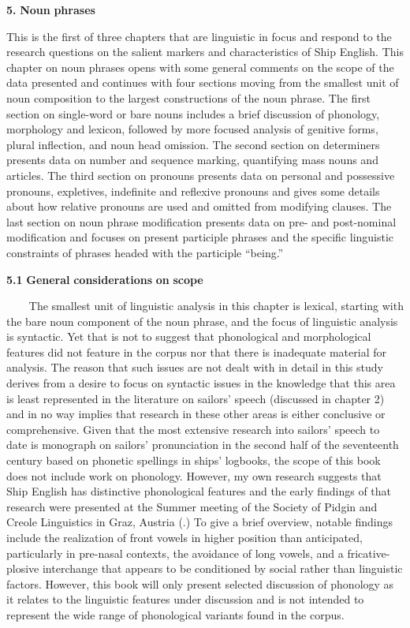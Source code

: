 \textbf{5.} \textbf{Noun} \textbf{phrases}

This is the first of three chapters that are linguistic in focus and respond to the research questions on the salient markers and characteristics of Ship English. This chapter on noun phrases opens with some general comments on the scope of the data presented and continues with four sections moving from the smallest unit of noun composition to the largest constructions of the noun phrase. The first section on single-word or bare nouns includes a brief discussion of phonology, morphology and lexicon, followed by more focused analysis of genitive forms, plural inflection, and noun head omission. The second section on determiners presents data on number and sequence marking, quantifying mass nouns and articles. The third section on pronouns presents data on personal and possessive pronouns, expletives, indefinite and reflexive pronouns and gives some details about how relative pronouns are used and omitted from modifying clauses. The last section on noun phrase modification presents data on pre- and post-nominal modification and focuses on present participle phrases and the specific linguistic constraints of phrases headed with the participle “being.” 

\textbf{5.1} \textbf{General} \textbf{considerations} \textbf{on} \textbf{scope}

\textbf{~~~}   The smallest unit of linguistic analysis in this chapter is lexical, starting with the bare noun component of the noun phrase, and the focus of linguistic analysis is syntactic. Yet that is not to suggest that phonological and morphological features did not feature in the corpus nor that there is inadequate material for analysis. The reason that such issues are not dealt with in detail in this study derives from a desire to focus on syntactic issues in the knowledge that this area is least represented in the literature on sailors’ speech (discussed in chapter 2) and in no way implies that research in these other areas is either conclusive or comprehensive. Given that the most extensive research into sailors’ speech to date is  monograph on sailors’ pronunciation in the second half of the seventeenth century based on phonetic spellings in ships’ logbooks, the scope of this book does not include work on phonology. However, my own research suggests that Ship English has distinctive phonological features and the early findings of that research were presented at the Summer meeting of the Society of Pidgin and Creole Linguistics in Graz, Austria (\citealt{Delgado2015}.) To give a brief overview, notable findings include the realization of front vowels in higher position than anticipated, particularly in pre-nasal contexts, the avoidance of long vowels, and a fricative-plosive interchange that appears to be conditioned by social rather than linguistic factors. However, this book will only present selected discussion of phonology as it relates to the linguistic features under discussion and is not intended to represent the wide range of phonological variants found in the corpus. 

